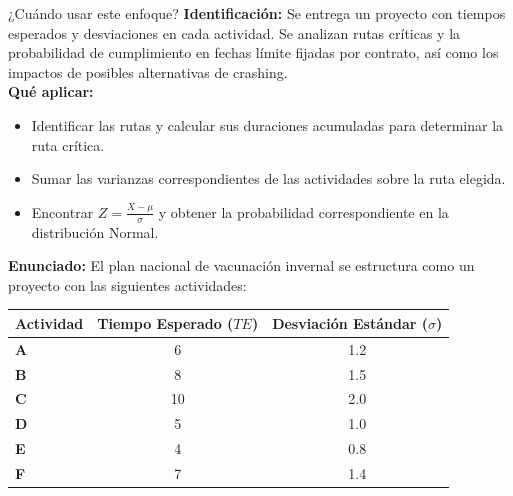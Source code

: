 \documentclass[11pt, a4paper]{article}
\begin{document}
  \begin{tipprueba}{¿Cuándo usar este enfoque?}
    \textbf{Identificación:} Se entrega un proyecto con tiempos esperados y desviaciones en cada actividad. Se analizan rutas críticas y la probabilidad de cumplimiento en fechas límite fijadas por contrato, así como los impactos de posibles alternativas de crashing.\\
    \textbf{Qué aplicar:}
    \begin{itemize}
      \item Identificar las rutas y calcular sus duraciones acumuladas para determinar la ruta crítica.
      \item Sumar las varianzas correspondientes de las actividades sobre la ruta elegida.
      \item Encontrar $Z = \frac{X - \mu}{\sigma}$ y obtener la probabilidad correspondiente en la distribución Normal.
    \end{itemize}
  \end{tipprueba}

  \textbf{Enunciado:}
  El plan nacional de vacunación invernal se estructura como un proyecto con las siguientes actividades:
  \begin{center}
  \end{center}

  \begin{center}
  \small
  \begin{tabular}{lcc}
    \toprule
    \textbf{Actividad} & \textbf{Tiempo Esperado ($TE$)} & \textbf{Desviación Estándar ($\sigma$)} \\
    \midrule
    \textbf{A} & 6 & 1.2 \\
    \textbf{B} & 8 & 1.5 \\
    \textbf{C} & 10 & 2.0 \\
    \textbf{D} & 5 & 1.0 \\
    \textbf{E} & 4 & 0.8 \\
    \textbf{F} & 7 & 1.4 \\
    \bottomrule
  \end{tabular}
  \end{center}
\end{document}
